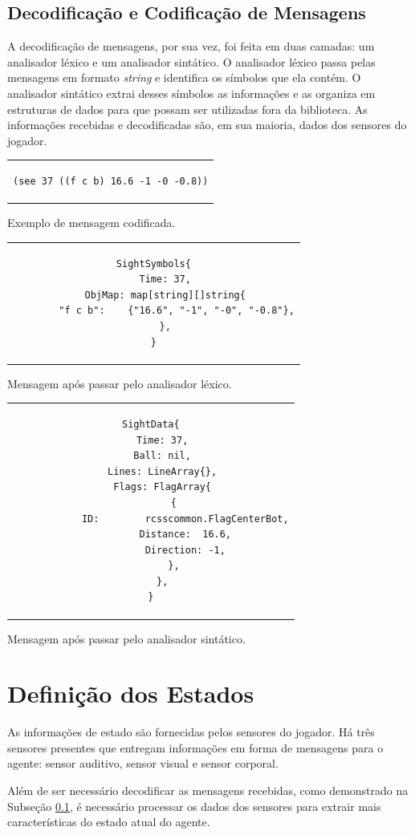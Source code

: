 \subsection{Decodificação e Codificação de Mensagens}
\label{sec:messages}
A decodificação de mensagens, por sua vez, foi feita em duas camadas: um analisador léxico e um analisador sintático. O analisador léxico passa pelas mensagens em formato \textit{string} e identifica os símbolos que ela contém. O analisador sintático extrai desses símbolos as informações e as organiza em estruturas de dados para que possam ser utilizadas fora da biblioteca. As informações recebidas e decodificadas são, em sua maioria, dados dos sensores do jogador.
\begin{center}

\begin{tabular}{c}
\begin{lstlisting}
(see 37 ((f c b) 16.6 -1 -0 -0.8))
\end{lstlisting}
\end{tabular}

Exemplo de mensagem codificada.

\hfill


\begin{tabular}{c}
\begin{lstlisting}
SightSymbols{
	Time: 37,
	ObjMap: map[string][]string{
		"f c b":    {"16.6", "-1", "-0", "-0.8"},
	},
}
\end{lstlisting}
\end{tabular}

Mensagem após passar pelo analisador léxico.

\hfill


\begin{tabular}{c}
\begin{lstlisting}
SightData{
	Time: 37,
	Ball: nil,
	Lines: LineArray{},
	Flags: FlagArray{
		{
			ID:        rcsscommon.FlagCenterBot,
			Distance:  16.6,
			Direction: -1,
		},
	},
}
\end{lstlisting}
\end{tabular}

Mensagem após passar pelo analisador sintático.

\end{center}

\section{Definição dos Estados}
\par As informações de estado são fornecidas pelos sensores do jogador. Há três sensores presentes que entregam informações em forma de mensagens para o agente: sensor auditivo, sensor visual e sensor corporal.
\par Além de ser necessário decodificar as mensagens recebidas, como demonstrado na Subseção \ref{sec:messages}, é necessário processar os dados dos sensores para extrair mais características do estado atual do agente. 

